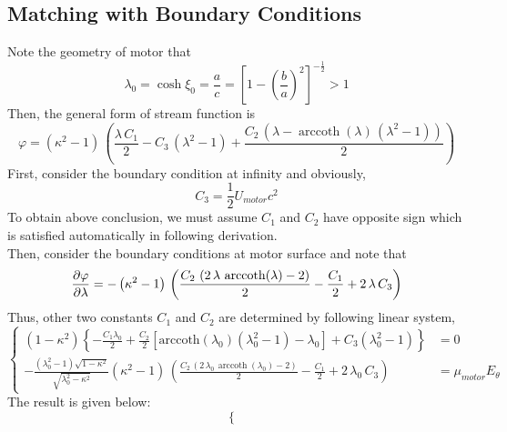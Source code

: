 \documentclass[fontsize=11pt, %
                             paper=a4, %
                             twoside, %
                             captions=tableheading,
                             index=totoc,
                             hyperref]{labbook}
\begin{document}
\begin{addmargin}[4cm]{0cm}
\subsection{Matching with Boundary Conditions}
Note the geometry of motor that
\begin{equation}
\lambda_0=\cosh\xi_0=\frac{a}{c}=\left[1-\left(\frac{b}{a}\right)^2\right]^{-\frac{1}{2}}>1
\end{equation}
Then, the general form of stream function is
\begin{equation}\label{eqn_streamFunc}
\varphi{} = \left({\kappa{}}^2 - 1\right)\, \left(\frac{\lambda{}\, C_{1}}{2} - C_{3}\, \left({\lambda{}}^2 - 1\right) + \frac{C_{2}\, \left(\lambda{} - \mathop{\mathrm{arccoth}}\nolimits\!\left(\lambda{}\right)\, \left({\lambda{}}^2 - 1\right)\right)}{2}\right)
\end{equation}
First, consider the boundary condition at infinity and obviously,
\begin{equation}
C_3=\frac{1}{2}U_{motor}c^2
\end{equation}
To obtain above conclusion, we must assume $C_1$ and $C_2$ have opposite sign which is satisfied automatically in following derivation.\\
Then, consider the boundary conditions at motor surface and note that
\begin{equation}
\frac{\partial \varphi}{\partial \lambda}=- \left({\kappa{}}^2 - 1\right)\, \left(\frac{C_{2}\, \left(2\, \lambda{}\, \mathop{\mathrm{arccoth}}\nolimits\!\left(\lambda{}\right) - 2\right)}{2} - \frac{C_{1}}{2} + 2\, \lambda{}\, C_{3}\right)
\end{equation}
Thus, other two constants $C_1$ and $C_2$ are determined by following linear system,
\begin{equation}
\left\{
\begin{aligned}
(1-\kappa^2)\left\{-\frac{C_1\lambda_0}{2}+\frac{C_2}{2}\left[\mathrm{arccoth}(\lambda_0)(\lambda_0^2-1)-\lambda_0\right]+C_3(\lambda_0^2-1)\right\}&=0\\
-\frac{(\lambda_0^2-1)\sqrt{1-\kappa^2}}{\sqrt{\lambda_0^2-\kappa^2}} \left({\kappa{}}^2 - 1\right)\, \left(\frac{C_{2}\, \left(2\, \lambda_0{}\, \mathop{\mathrm{arccoth}}\nolimits\!\left(\lambda_0{}\right) - 2\right)}{2} - \frac{C_{1}}{2} + 2\, \lambda_0{}\, C_{3}\right)&=\mu_{motor}E_\theta
\end{aligned}
\right.
\end{equation}
The result is given below:
\begin{equation}
\left\{
\begin{aligned}

\end{aligned}
\end{equation}
\end{addmargin}
\end{document}
